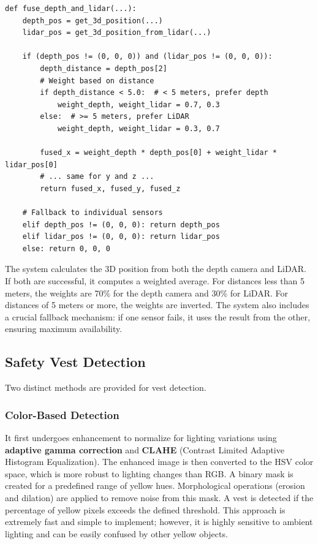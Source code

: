 \documentclass[11pt, a4paper]{article}
\begin{document}
\begin{lstlisting}[caption={Sensor fusion logic from \texttt{lidar\_utils.py}}, label={lst:fusion}]
def fuse_depth_and_lidar(...):
    depth_pos = get_3d_position(...)
    lidar_pos = get_3d_position_from_lidar(...)
    
    if (depth_pos != (0, 0, 0)) and (lidar_pos != (0, 0, 0)):
        depth_distance = depth_pos[2]
        # Weight based on distance
        if depth_distance < 5.0:  # < 5 meters, prefer depth
            weight_depth, weight_lidar = 0.7, 0.3
        else:  # >= 5 meters, prefer LiDAR
            weight_depth, weight_lidar = 0.3, 0.7
            
        fused_x = weight_depth * depth_pos[0] + weight_lidar * lidar_pos[0]
        # ... same for y and z ...
        return fused_x, fused_y, fused_z
    
    # Fallback to individual sensors
    elif depth_pos != (0, 0, 0): return depth_pos
    elif lidar_pos != (0, 0, 0): return lidar_pos
    else: return 0, 0, 0
\end{lstlisting}

The system calculates the 3D position from both the depth camera and LiDAR. If both are successful, it computes a weighted average. For distances less than 5 meters, the weights are 70\% for the depth camera and 30\% for LiDAR. For distances of 5 meters or more, the weights are inverted. The system also includes a crucial fallback mechanism: if one sensor fails, it uses the result from the other, ensuring maximum availability.

\subsection{Safety Vest Detection}
Two distinct methods are provided for vest detection.

\subsubsection{Color-Based Detection}
It first undergoes enhancement to normalize for lighting variations using \textbf{adaptive gamma correction} and \textbf{CLAHE} (Contrast Limited Adaptive Histogram Equalization). The enhanced image is then converted to the HSV color space, which is more robust to lighting changes than RGB. A binary mask is created for a predefined range of yellow hues. Morphological operations (erosion and dilation) are applied to remove noise from this mask. A vest is detected if the percentage of yellow pixels exceeds the defined threshold. This approach is extremely fast and simple to implement; however, it is highly sensitive to ambient lighting and can be easily confused by other yellow objects.\\
\end{document}
